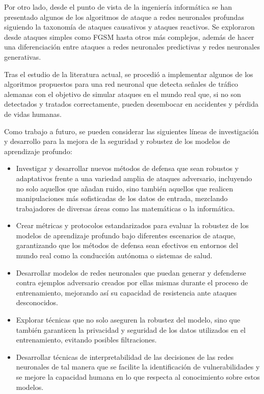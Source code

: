 Por otro lado, desde el punto de vista de la ingeniería informática se han presentado algunos de los algoritmos de ataque a redes neuronales profundas siguiendo la taxonomía de ataques causativos y ataques reactivos. Se exploraron desde ataques simples como FGSM hasta otros más complejos, además de hacer una diferenciación entre ataques a redes neuronales predictivas y redes neuronales generativas. 

Tras el estudio de la literatura actual, se procedió a implementar algunos de los algoritmos propuestos para una red neuronal que detecta señales de tráfico alemanas con el objetivo de simular ataques en el mundo real que, si no son detectados y tratados correctamente, pueden desembocar en accidentes y pérdida de vidas humanas.

Como trabajo a futuro, se pueden considerar las siguientes líneas de investigación y desarrollo para la mejora de la seguridad y robustez de los modelos de aprendizaje profundo:

\begin{itemize}
    \item Investigar y desarrollar nuevos métodos de defensa que sean robustos y adaptativos frente a una variedad amplia de ataques adversario, incluyendo no solo aquellos que añadan ruido, sino también aquellos que realicen manipulaciones más sofisticadas de los datos de entrada, mezclando trabajadores de diversas áreas como las matemáticas o la informática.

    \item Crear métricas y protocolos estandarizados para evaluar la robustez de los modelos de aprendizaje profundo bajo diferentes escenarios de ataque, garantizando que los métodos de defensa sean efectivos en entornos del mundo real como la conducción autónoma o sistemas de salud.

    \item Desarrollar modelos de redes neuronales que puedan generar y defenderse contra ejemplos adversario creados por ellas mismas durante el proceso de entrenamiento, mejorando así su capacidad de resistencia ante ataques desconocidos.

    \item Explorar técnicas que no solo aseguren la robustez del modelo, sino que también garanticen la privacidad y seguridad de los datos utilizados en el entrenamiento, evitando posibles filtraciones.

    \item Desarrollar técnicas de interpretabilidad de las decisiones de las redes neuronales de tal manera que se facilite la identificación de vulnerabilidades y se mejore la capacidad humana en lo que respecta al conocimiento sobre estos modelos.
\end{itemize}